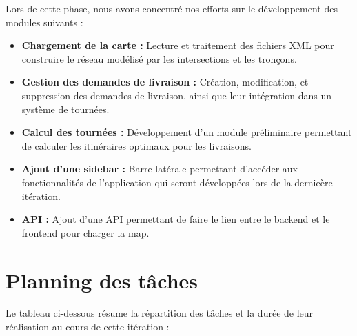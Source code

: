 \documentclass[a4paper]{article}
\begin{document}
Lors de cette phase, nous avons concentré nos efforts sur le développement des modules suivants :
\begin{itemize}
    \item \textbf{Chargement de la carte :} Lecture et traitement des fichiers XML pour construire le réseau modélisé par les intersections et les tronçons.
    \item \textbf{Gestion des demandes de livraison :} Création, modification, et suppression des demandes de livraison, ainsi que leur intégration dans un système de tournées.
    \item \textbf{Calcul des tournées :} Développement d’un module préliminaire permettant de calculer les itinéraires optimaux pour les livraisons.
    \item \textbf{Ajout d'une sidebar :} Barre latérale permettant d'accéder aux fonctionnalités de l'application qui seront développées lors de la dernieère itération.
    \item \textbf{API :} Ajout d'une API permettant de faire le lien entre le backend et le frontend pour charger la map.
\end{itemize}

\section{Planning des tâches}

Le tableau ci-dessous résume la répartition des tâches et la durée de leur réalisation au cours de cette itération :
\end{document}
